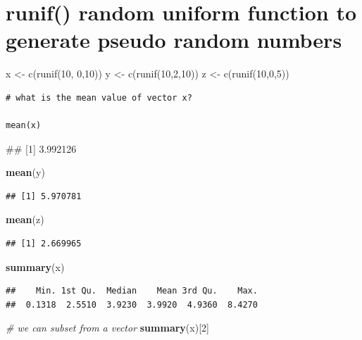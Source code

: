 \documentclass[]{article}
\newenvironment{Shaded}{}{}
\newcommand{\KeywordTok}[1]{\textcolor[rgb]{0.00,0.44,0.13}{\textbf{{#1}}}}
\newcommand{\DecValTok}[1]{\textcolor[rgb]{0.25,0.63,0.44}{{#1}}}
\newcommand{\CommentTok}[1]{\textcolor[rgb]{0.38,0.63,0.69}{\textit{{#1}}}}
\newcommand{\NormalTok}[1]{{#1}}
\begin{document}
\section{runif() random uniform function to generate pseudo random
numbers}\label{runif-random-uniform-function-to-generate-pseudo-random-numbers}

x \textless{}- c(runif(10, 0,10)) y \textless{}- c(runif(10,2,10)) z
\textless{}- c(runif(10,0,5))

\begin{verbatim}
# what is the mean value of vector x?

mean(x)
\end{verbatim}

\begin{Shaded}
\begin{Highlighting}[]
\NormalTok{## [1] 3.992126}
\end{Highlighting}
\end{Shaded}

\begin{Shaded}
\begin{Highlighting}[]
\KeywordTok{mean}\NormalTok{(y)}
\end{Highlighting}
\end{Shaded}

\begin{verbatim}
## [1] 5.970781
\end{verbatim}

\begin{Shaded}
\begin{Highlighting}[]
\KeywordTok{mean}\NormalTok{(z)}
\end{Highlighting}
\end{Shaded}

\begin{verbatim}
## [1] 2.669965
\end{verbatim}

\begin{Shaded}
\begin{Highlighting}[]
\KeywordTok{summary}\NormalTok{(x)}
\end{Highlighting}
\end{Shaded}

\begin{verbatim}
##    Min. 1st Qu.  Median    Mean 3rd Qu.    Max. 
##  0.1318  2.5510  3.9230  3.9920  4.9360  8.4270
\end{verbatim}

\begin{Shaded}
\begin{Highlighting}[]
\CommentTok{# we can subset from a vector}
\KeywordTok{summary}\NormalTok{(x)[}\DecValTok{2}\NormalTok{]}
\end{Highlighting}
\end{Shaded}
\end{document}
